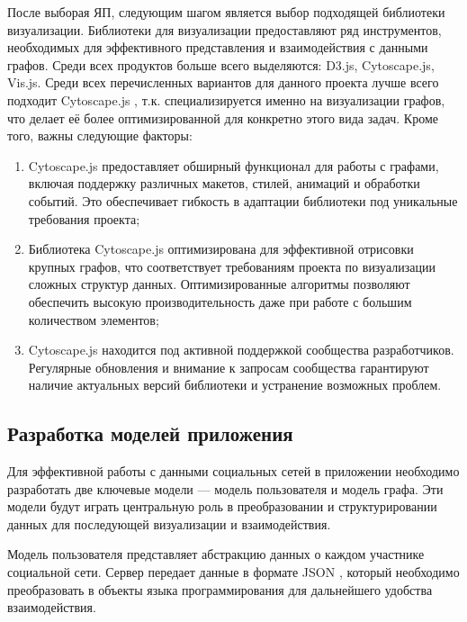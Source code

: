 \documentclass[14pt, russian]{scrartcl}
\begin{document}
После выборая ЯП, следующим шагом является выбор подходящей библиотеки визуализации. Библиотеки для визуализации предоставляют ряд инструментов, необходимых для эффективного представления и взаимодействия с данными графов. Среди всех продуктов больше всего выделяются: D3.js, Cytoscape.js, Vis.js. Среди всех перечисленных вариантов для данного проекта лучше всего подходит Cytoscape.js \cite{Cytoscapejs}, т.к. 
специализируется именно на визуализации графов, что делает её более оптимизированной для конкретно этого вида задач. Кроме того, важны следующие факторы:

\begin{enumerate}
  \item Cytoscape.js предоставляет обширный функционал для работы с графами, включая поддержку различных макетов, стилей, анимаций и обработки событий. Это обеспечивает гибкость в адаптации библиотеки под уникальные требования проекта;

  \item Библиотека Cytoscape.js оптимизирована для эффективной отрисовки крупных графов, что соответствует требованиям проекта по визуализации сложных структур данных. Оптимизированные алгоритмы позволяют обеспечить высокую производительность даже при работе с большим количеством элементов;


  \item Cytoscape.js находится под активной поддержкой сообщества разработчиков. Регулярные обновления и внимание к запросам сообщества гарантируют наличие актуальных версий библиотеки и устранение возможных проблем.
    
\end{enumerate}
    
\subsection{Разработка моделей приложения}


Для эффективной работы с данными социальных сетей в приложении необходимо разработать две ключевые модели --- модель пользователя и модель графа. Эти модели будут играть центральную роль в преобразовании и структурировании данных для последующей визуализации и взаимодействия.

Модель пользователя представляет абстракцию данных о каждом участнике социальной сети. Сервер передает данные в формате JSON \cite{JSON}, который необходимо преобразовать в объекты языка программирования для дальнейшего удобства взаимодействия.
\end{document}
